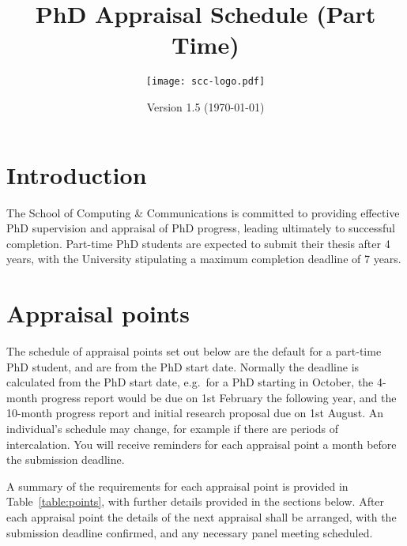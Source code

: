 \documentclass[12pt,a4paper]{article}
\title{PhD Appraisal Schedule (Part Time)}
\author{\texttt{[image: scc-logo.pdf]}}
\date{Version 1.5 (\today)}
\begin{document}
\maketitle

\section{Introduction}
The School of Computing \& Communications is committed to providing effective PhD supervision and appraisal of PhD progress, leading ultimately to successful completion. Part-time PhD students are expected to submit their thesis after 4 years, with the University stipulating a maximum completion deadline of 7 years.



\section{Appraisal points} \label{sec:points}

The schedule of appraisal points set out below are the default for a part-time PhD student, and are from the PhD start date. Normally the deadline is calculated from the PhD start date, e.g.\ for a PhD starting in October, the 4-month progress report would be due on 1st February the following year, and the 10-month progress report and initial research proposal due on 1st August. An individual's schedule may change, for example if there are periods of intercalation. You will receive reminders for each appraisal point a month before the submission deadline.

A summary of the requirements for each appraisal point is provided in Table~\ref{table:points}, with further details provided in the sections below. After each appraisal point the details of the next appraisal shall be arranged, with the submission deadline confirmed, and any necessary panel meeting scheduled.
\end{document}
